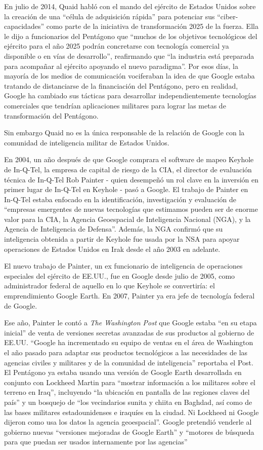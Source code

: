\documentclass[10pt,a5paper,twoside,spanish,]{book}
\begin{document}
En julio de 2014, Quaid habló con el mando del ejército de Estados
Unidos sobre la creación de una ``célula de adquisición rápida'' para
potenciar sus ``ciber-capacidades'' como parte de la iniciativa de
transformación 2025 de la fuerza. Ella le dijo a funcionarios del
Pentágono que ``muchos de los objetivos tecnológicos del ejército para
el año 2025 podrán concretarse con tecnología comercial ya disponible o
en vías de desarrollo'', reafirmando que ``la industria está preparada
para acompañar al ejército apoyando el nuevo paradigma''. Por esos días,
la mayoría de los medios de comunicación vociferaban la idea de que
Google estaba tratando de distanciarse de la financiación del Pentágono,
pero en realidad, Google ha cambiado sus tácticas para desarrollar
independientemente tecnologías comerciales que tendrían aplicaciones
militares para lograr las metas de transformación del Pentágono.

Sin embargo Quaid no es la única responsable de la relación de Google
con la comunidad de inteligencia militar de Estados Unidos.

En 2004, un año después de que Google comprara el software de mapeo
Keyhole de In-Q-Tel, la empresa de capital de riesgo de la CIA, el
director de evaluación técnica de In-Q-Tel Rob Painter - quien desempeñó
un rol clave en la inversión en primer lugar de In-Q-Tel en Keyhole -
pasó a Google. El trabajo de Painter en In-Q-Tel estaba enfocado en la
identificación, investigación y evaluación de ``empresas emergentes de
nuevas tecnologías que estimamos pueden ser de enorme valor para la CIA,
la Agencia Geoespacial de Inteligencia Nacional (NGA), y la Agencia de
Inteligencia de Defensa''. Además, la NGA confirmó que su inteligencia
obtenida a partir de Keyhole fue usada por la NSA para apoyar
operaciones de Estados Unidos en Irak desde el año 2003 en adelante.

El nuevo trabajo de Painter, un ex funcionario de inteligencia de
operaciones especiales del ejército de EE.UU., fue en Google desde julio
de 2005, como administrador federal de aquello en lo que Keyhole se
convertiría: el emprendimiento Google Earth. En 2007, Painter ya era
jefe de tecnología federal de Google.

Ese año, Painter le contó a \emph{The Washington Post} que Google estaba
``en su etapa inicial'' de venta de versiones secretas avanzadas de sus
productos al gobierno de EE.UU. ``Google ha incrementado su equipo de
ventas en el área de Washington el año pasado para adaptar sus productos
tecnológicos a las necesidades de las agencias civiles y militares y de
la comunidad de inteligencia'' reportaba el Post. El Pentágono ya estaba
usando una versión de Google Earth desarrollada en conjunto con Lockheed
Martin para ``mostrar información a los militares sobre el terreno en
Iraq'', incluyendo ``la ubicación en pantalla de las regiones claves del
país'' y un bosquejo de ``los vecindarios sunita y chiita en Baghdad,
así como de las bases militares estadounidenses e iraquíes en la ciudad.
Ni Lockheed ni Google dijeron como usa los datos la agencia
geoespacial''. Google pretendió venderle al gobierno nuevas ``versiones
mejoradas de Google Earth'' y ``motores de búsqueda para que puedan ser
usados internamente por las agencias''
\end{document}
